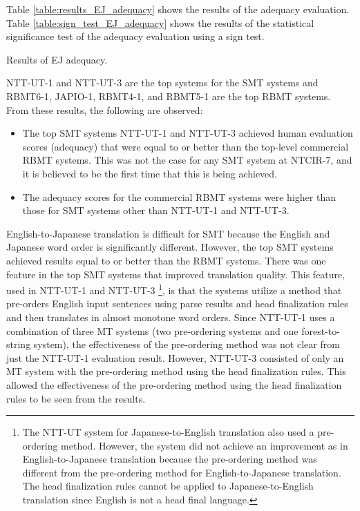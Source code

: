 \documentclass[english]{jnlp_1.4}
\begin{document}
Table \ref{table:results_EJ_adequacy} shows the results of the adequacy evaluation. 
Table \ref{table:sign_test_EJ_adequacy} shows the results of the statistical significance test of the adequacy evaluation using a sign test.

\begin{table}[p]
\caption{Results of EJ adequacy.}
\label{table:results_EJ_adequacy}

\end{table}
\begin{table}[p]
\label{table:sign_test_EJ_adequacy}

\end{table}


NTT-UT-1 and NTT-UT-3 are the top systems for the SMT systems and RBMT6-1, JAPIO-1, RBMT4-1, and RBMT5-1 are the top RBMT systems.
From these results, the following are observed: 
\begin{itemize}
\item The top SMT systems NTT-UT-1 and NTT-UT-3 achieved human 
evaluation scores (adequacy) that were equal to or better than the top-level commercial RBMT systems. 
This was not the case for any SMT system at NTCIR-7, and it is believed to be the first time that this is being achieved. 
\item The adequacy scores for the commercial RBMT systems were higher than those for SMT systems other than NTT-UT-1 and NTT-UT-3.
\end{itemize}

English-to-Japanese translation is difficult for SMT because the English and Japanese word order is significantly different.
However, the top SMT systems achieved results equal to or better than the RBMT systems. 
There was one feature in the top SMT systems that improved translation quality. 
This feature, used in NTT-UT-1 and NTT-UT-3 \cite{NTT-UT:NTCIR9}
\footnote{The NTT-UT system for Japanese-to-English translation also used a pre-ordering method. 
However, the system did not achieve an improvement as in English-to-Japanese translation because the pre-ordering method was different from the pre-ordering method for English-to-Japanese translation.
The head finalization rules cannot be applied to Japanese-to-English translation since English is not a head final language.}, is that the systems utilize a method that pre-orders English input sentences using parse results and head finalization rules \cite{isozaki-EtAl:2010:WMT} and then translates in almost monotone word orders. 
Since NTT-UT-1 uses a combination of three MT systems (two pre-ordering systems and one forest-to-string system), the effectiveness of the pre-ordering method was not clear from just the NTT-UT-1 evaluation result. 
However, NTT-UT-3 consisted of only an MT system with the pre-ordering method using the head finalization rules. 
This allowed the effectiveness of the pre-ordering method using the head finalization rules to be seen from the results. 
\end{document}
